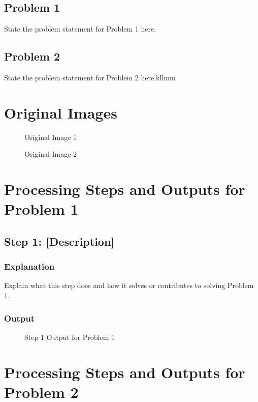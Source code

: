 \documentclass[12pt,a4paper]{report}
\begin{document}
\subsection{Problem 1}
State the problem statement for Problem 1 here.

\subsection{Problem 2}
State the problem statement for Problem 2 here.kllmm




\section{Original Images}
\begin{figure}[h]
  \centering

  \caption{Original Image 1}
\end{figure}

\begin{figure}[h]
  \centering

  \caption{Original Image 2}
\end{figure}

\section{Processing Steps and Outputs for Problem 1}
\subsection{Step 1: [Description]}
\subsubsection{Explanation}
Explain what this step does and how it solves or contributes to solving Problem 1.

\subsubsection{Output}
\begin{figure}[h]
  \centering

  \caption{Step 1 Output for Problem 1}
\end{figure}


\section{Processing Steps and Outputs for Problem 2}
\end{document}
